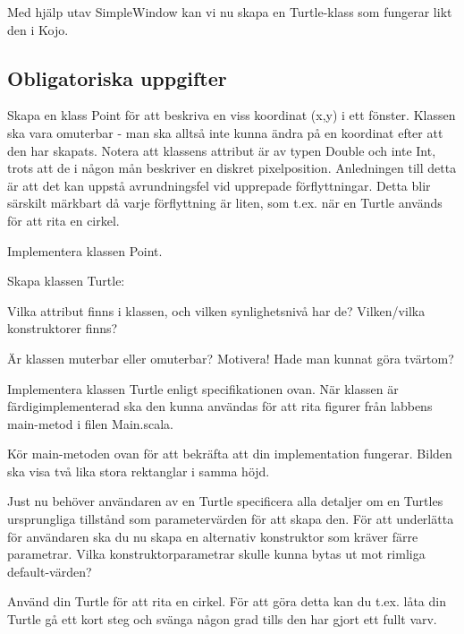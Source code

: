 Med hjälp utav SimpleWindow kan vi nu skapa en Turtle-klass som fungerar likt den i Kojo. 

\subsection{Obligatoriska uppgifter}

\Task Skapa en klass Point för att beskriva en viss koordinat (x,y) i ett fönster. Klassen ska vara omuterbar - man ska alltså inte kunna ändra på en koordinat efter att den har skapats. Notera att klassens attribut är av typen Double och inte Int, trots att de i någon mån beskriver en diskret pixelposition. Anledningen till detta är att det kan uppstå avrundningsfel vid upprepade förflyttningar. Detta blir särskilt märkbart då varje förflyttning är liten, som t.ex. när en Turtle används för att rita en cirkel.


\Subtask Implementera klassen Point.

\Task Skapa klassen Turtle:


\Subtask Vilka attribut finns i klassen, och vilken synlighetsnivå har de? Vilken/vilka konstruktorer finns? 

\Subtask Är klassen muterbar eller omuterbar? Motivera! Hade man kunnat göra tvärtom?

\Subtask Implementera klassen Turtle enligt specifikationen ovan. När klassen är färdigimplementerad ska den kunna användas för att rita figurer från labbens main-metod i filen Main.scala.


\Subtask Kör main-metoden ovan för att bekräfta att din implementation fungerar. Bilden ska visa två lika stora rektanglar i samma höjd.

\Subtask Just nu behöver användaren av en Turtle specificera alla detaljer om en Turtles ursprungliga tillstånd som parametervärden för att skapa den. För att underlätta för användaren ska du nu skapa en alternativ konstruktor som kräver färre parametrar. Vilka konstruktorparametrar skulle kunna bytas ut mot rimliga default-värden?

\Subtask Använd din Turtle för att rita en cirkel. För att göra detta kan du t.ex. låta din Turtle gå ett kort steg och svänga någon grad tills den har gjort ett fullt varv.

